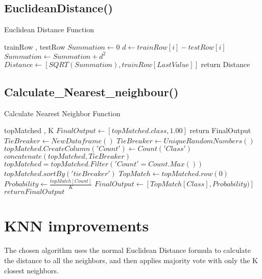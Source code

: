 \documentclass{article}
\begin{document}
 \subsection{EuclideanDistance()}
\begin{algorithm}[H]
\caption{Euclidean Distance Function}
\begin{algorithmic}[1]
\REQUIRE trainRow , testRow 
\STATE $ Summation \gets 0	 $
        \STATE $d \gets trainRow[i] - testRow[i]$
        \STATE $Summation \gets Summation + d^{2}$
  	\ENDFOR
\STATE $Distance \gets [SQRT(Summation) , trainRow[LastValue] ]$  
\STATE return Distance

\end{algorithmic}
\end{algorithm}


 \subsection{Calculate\_Nearest\_neighbour()}
 
\begin{algorithm}[H]
\caption{Calculate Nearest Neighbor Function}
\begin{algorithmic}[1]
\REQUIRE topMatched , K 
	    \STATE $ FinalOutput \gets [topMatched.class, 1.00] $ 
	    \STATE return FinalOutput
	\ENDIF
	\STATE $TieBreaker \gets NewDataframe()$
	\STATE $TieBreaker \gets UniqueRandomNumbers()$
	\STATE $topMatched.CreateColumn('Count') \gets Count('Class')$
	\STATE $concatenate(topMatched, TieBreaker)$
	\STATE $topMatched = topMatched.Filter( 'Count' = Count.Max())$
	\STATE $topMatched.sortBy('tieBreaker')$
	\STATE $TopMatch \gets topMatched.row(0) $ 
	\STATE $Probability \gets \frac{topMatch[Count]}{ K}$
	\STATE $ FinalOutput \gets [TopMatch[Class], Probability)] $ 
    \STATE $return FinalOutput$
       
\end{algorithmic}
\end{algorithm}


\section{KNN improvements}  

The chosen algorithm uses the normal Euclidean Distance formula to calculate the distance to all the neighbors, and then applies majority vote with only the K closest neighbors. \\
\end{document}
